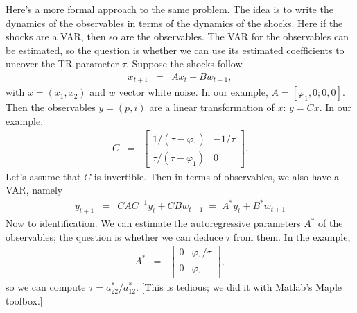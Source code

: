 \documentclass[11pt]{article}
\begin{document}
{\begin{itemize}
Here's a more formal approach to the same problem.
The idea is to write the dynamics of the observables in
terms of the dynamics of the shocks.
Here if the shocks are a VAR, then so are the observables.
The VAR for the observables can be estimated,
so the question is whether we can use its estimated coefficients
to uncover the TR parameter $\tau$.
Suppose the shocks follow
\begin{eqnarray*}
    x_{t+1}  &=&  A x_t + B w_{t+1} ,
\end{eqnarray*}
with $x = (x_1,x_2)$ and $w$ vector white noise.
In our example, $ A = [\varphi_1, 0; 0, 0]$.
Then the observables $ y = (p,i)$ are a
linear transformation of $x$:
$ y = C x $.
In our example,
\begin{eqnarray*}
   C  &=&
    \left[
    \begin{array}{cc}
         1/(\tau-\varphi_1) & - 1/\tau \\ \tau/(\tau-\varphi_1) & 0
    \end{array}
    \right] .
\end{eqnarray*}
Let's assume that $C$ is invertible.
Then in terms of observables, we also have a VAR, namely
\begin{eqnarray*}
    y_{t+1}  &=&  C A C^{-1} y_t + C B w_{t+1}
             \;=\;  A^* y_t + B^* w_{t+1}
\end{eqnarray*}
Now to identification.
We can estimate the autoregressive parameters $A^*$ of the observables;
the question is whether we can deduce $\tau$ from them.
In the example,
\begin{eqnarray*}
   A^*  &=&
    \left[
    \begin{array}{cc}
        0 & \varphi_1/\tau  \\  0 & \varphi_1
    \end{array}
    \right] ,
\end{eqnarray*}
so we can compute $\tau = a^*_{22}/a^*_{12}$.
[This is tedious; we did it with Matlab's Maple toolbox.]
\begin{comment}
Even if $\varphi_2 \neq \varphi_1$ we can identify $\tau$ from estimates
of $A^*$:
\begin{eqnarray*}
   A^*  &=&
    \left[
    \begin{array}{cc}
        \varphi_2 & (\varphi_1-\varphi_2)/\tau  \\  0 & \varphi_1
    \end{array}
    \right] .
\end{eqnarray*}
[Guess:  you need $A$ to be triangular.]
\end{comment}


\end{itemize}}
\end{document}
